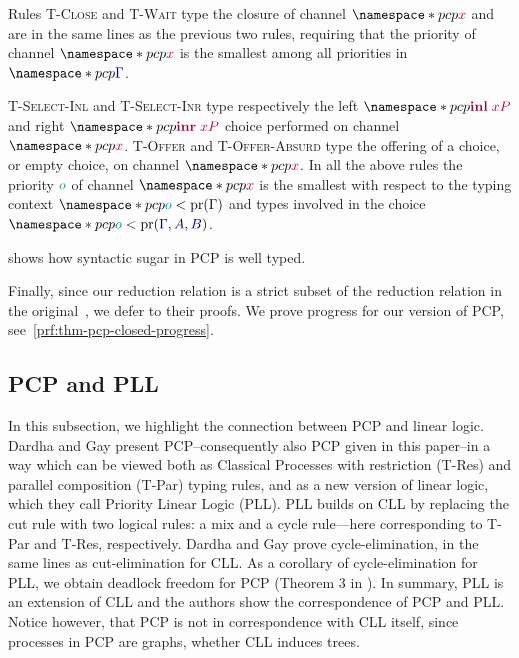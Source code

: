 Rules \textsc{T-Close} and \textsc{T-Wait} type the closure of channel $\pcp{\tm{x}}$ and are in the same lines as the previous two rules, requiring that the priority of channel $\pcp{\tm{x}}$ is the smallest among all priorities in $\pcp{\ty{\Gamma}}$.

\textsc{T-Select-Inl} and \textsc{T-Select-Inr} type respectively the left $\pcp{\tm{\inl{x}{P}}}$ and right $\pcp{\tm{\inr{x}{P}}}$ choice performed on channel $\pcp{\tm{x}}$. \textsc{T-Offer} and \textsc{T-Offer-Absurd} type the offering of a choice, or empty choice, on channel $\pcp{\tm{x}}$. In all the above rules the priority $\cs{o}$ of channel $\pcp{\tm{x}}$ is the smallest with respect to the typing context $\pcp{\cs{o}<\minpr(\ty{\Gamma})}$ and types involved in the choice $\pcp{\cs{o}<\minpr(\ty{\Gamma},\ty{A},\ty{B})}$.

 shows how syntactic sugar in PCP is well typed.


Finally, since our reduction relation is a strict subset of the reduction relation in the original~\cite{dardhagay18extended}, we defer to their proofs. We prove progress for our version of PCP, see~\cref{prf:thm-pcp-closed-progress}.


\subsection{PCP and PLL}
In this subsection, we highlight the connection between PCP and linear logic.
Dardha and Gay \cite{dardhagay18} present PCP--consequently also PCP given in this paper--in a way which can be viewed both as Classical Processes with restriction (T-Res) and parallel composition (T-Par) typing rules, and as a new version of linear logic, which they call Priority Linear Logic (PLL).
PLL builds on CLL by replacing the cut rule with two logical rules: a mix and a cycle rule---here corresponding to T-Par and T-Res, respectively. Dardha and Gay \cite[\S 4]{dardhagay18} prove cycle-elimination, in the same lines as cut-elimination for CLL. As a corollary of cycle-elimination for PLL, we obtain deadlock freedom for PCP (Theorem 3 in \cite[\S 4]{dardhagay18}). In summary, PLL is an extension of CLL and the authors show the correspondence of PCP and PLL. Notice however, that PCP is not in correspondence with CLL itself, since processes in PCP are graphs, whether CLL induces trees.

